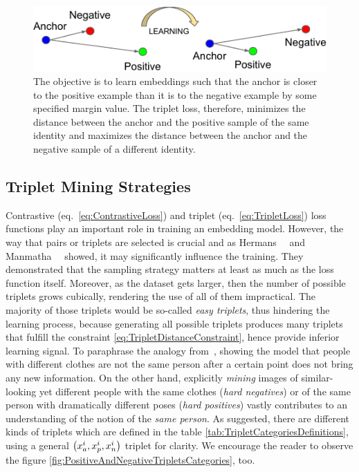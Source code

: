 \begin{figure}[t]
    \centerline{\includegraphics[width=0.7\linewidth]{figures/theoretical_foundations/triplet_loss_learning_process.pdf}}
    \caption[Triplet loss learning]{The objective is to learn embeddings such that the anchor is closer to the positive example than it is to the negative example by some specified margin value. The triplet loss, therefore, minimizes the distance between the anchor and the positive sample of the same identity and maximizes the distance between the anchor and the negative sample of a different identity. }
    \label{fig:TripletLossLearningProcess}
\end{figure}

\subsection{Triplet Mining Strategies}
\label{ssec:TripletMiningStrategies}

Contrastive (eq.~\ref{eq:ContrastiveLoss}) and triplet (eq.~\ref{eq:TripletLoss}) loss functions play an important role in training an embedding model. However, the way that pairs or triplets are selected is crucial and as Hermans~\etal{}~\cite{hermans2017triplet} and Manmatha~\etal{}~\cite{manmatha2017samplingmatters} showed, it may significantly influence the training. They demonstrated that the sampling strategy matters at least as much as the loss function itself. Moreover, as the dataset gets larger, then the number of possible triplets grows cubically, rendering the use of all of them impractical. The majority of those triplets would be so-called \emph{easy triplets}, thus hindering the learning process, because generating all possible triplets produces many triplets that fulfill the constraint \ref{eq:TripletDistanceConstraint}, hence provide inferior learning signal. To paraphrase the analogy from~\cite{hermans2017triplet}, showing the model that people with different clothes are not the same person after a certain point does not bring any new information. On the other hand, explicitly \emph{mining} images of similar-looking yet different people with the same clothes (\emph{hard negatives}) or of the same person with dramatically different poses (\emph{hard positives}) vastly contributes to an understanding of the notion of the \emph{same person}. As suggested, there are different kinds of triplets which are defined in the table \ref{tab:TripletCategoriesDefinitions}, using a general $\left( {x_a^i, x_p^i, x_n^i} \right)$ triplet for clarity. We encourage the reader to observe the figure \ref{fig:PositiveAndNegativeTripletsCategories}, too.

